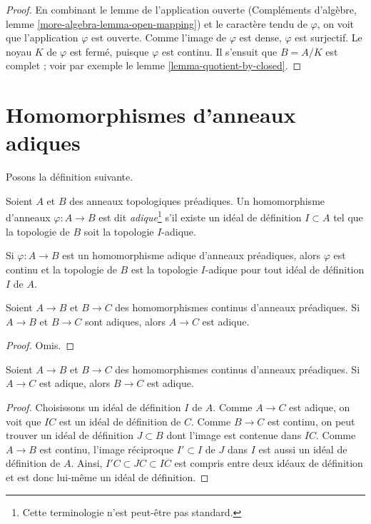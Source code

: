 \begin{proof}
En combinant le lemme de l'application ouverte (Compléments d'algèbre, lemme
\ref{more-algebra-lemma-open-mapping})
et le caractère tendu de $\varphi$, 
on voit que l'application $\varphi$ est ouverte. Comme l'image de $\varphi$
est dense, $\varphi$ est surjectif. Le noyau $K$
de $\varphi$ est fermé, puisque $\varphi$ est continu.
Il s'ensuit que $B = A/K$ est complet ; voir par exemple
le lemme \ref{lemma-quotient-by-closed}.
\end{proof}







\section{Homomorphismes d'anneaux adiques}
\label{section-adic-ring-maps}

\noindent
Posons la définition suivante.

\begin{definition}
\label{definition-adic-homomorphism}
Soient $A$ et $B$ des anneaux topologiques préadiques. Un homomorphisme d'anneaux
$\varphi : A \to B$ est dit {\it adique}\footnote{Cette terminologie n'est peut-être pas standard.}
s'il existe un idéal de définition $I \subset A$ tel que
la topologie de $B$ soit la topologie $I$-adique.
\end{definition}

\noindent
Si $\varphi : A \to B$ est un homomorphisme adique d'anneaux préadiques, alors
$\varphi$ est continu et la topologie de $B$ est la topologie $I$-adique
pour tout idéal de définition $I$ de $A$.

\begin{lemma}
\label{lemma-composition-adic}
Soient $A \to B$ et $B \to C$ des homomorphismes continus d'anneaux
préadiques. Si $A \to B$ et $B \to C$ sont adiques, alors
$A \to C$ est adique.
\end{lemma}

\begin{proof}
Omis.
\end{proof}

\begin{lemma}
\label{lemma-permanence-adic}
Soient $A \to B$ et $B \to C$ des homomorphismes continus d'anneaux
préadiques. Si $A \to C$ est adique, alors
$B \to C$ est adique.
\end{lemma}

\begin{proof}
Choisissons un idéal de définition $I$ de $A$. Comme $A \to C$ est adique,
on voit que $IC$ est un idéal de définition de $C$.
Comme $B \to C$ est continu, on peut trouver un
idéal de définition $J \subset B$ dont l'image est contenue dans $IC$.
Comme $A \to B$ est continu, l'image réciproque $I' \subset I$
de $J$ dans $I$ est aussi un idéal de définition de $A$.
Ainsi, $I'C \subset JC \subset IC$ est compris entre
deux idéaux de définition et est donc lui-même un idéal de définition.
\end{proof}

